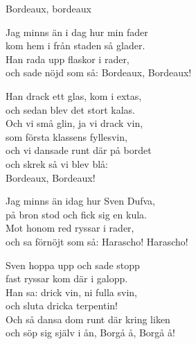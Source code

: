 \begin{song}{Bordeaux, bordeaux}
	
	
	
	
	Jag minns än i dag hur min fader\\
	kom hem i från staden så glader.\\
	Han rada upp flaskor i rader,\\
	och sade nöjd som så: Bordeaux, Bordeaux!\\
	\begin{repetition}
		Han drack ett glas, kom i extas,\\
		och sedan blev det stort kalas.\\
		Och vi små glin, ja vi drack vin,\\
		som första klassens fyllesvin,\\
		och vi dansade runt där på bordet\\
		och skrek så vi blev blå:\\
		Bordeaux, Bordeaux!
	\end{repetition}
	
	Jag minns än idag hur Sven Dufva,\\
	på bron stod och fick sig en kula.\\
	Mot honom red ryssar i rader,\\
	och sa förnöjt som så: Harascho! Harascho!\\
	\begin{repetition}
		Sven hoppa upp och sade stopp\\
		fast ryssar kom där i galopp.\\
		Han sa: drick vin, ni fulla svin,\\
		och sluta dricka terpentin!\\
		Och så dansa dom runt där kring liken\\
		och söp sig själv i ån, Borgå å, Borgå å!
	\end{repetition}

\end{song}
